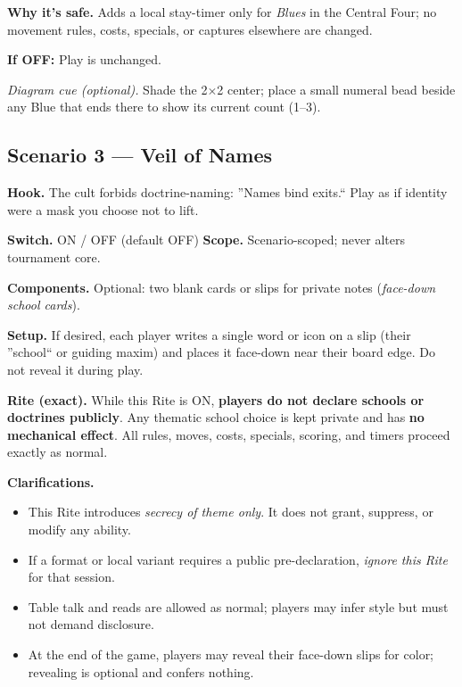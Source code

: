 \documentclass[11pt]{article}
\numberwithin{equation}{section} %
\theoremstyle{plain} %
\theoremstyle{definition} %
\theoremstyle{remark} %
\begin{document}
\medskip
\noindent\textbf{Why it's safe.} Adds a local stay-timer only for \emph{Blues} in the Central Four; no movement rules, costs, specials, or captures elsewhere are changed.

\medskip
\noindent\textbf{If \textsc{OFF}:} Play is unchanged.

\medskip
\noindent\textit{Diagram cue (optional).} Shade the 2\(\times\)2 center; place a small numeral bead beside any Blue that ends there to show its current count (1--3).

\subsection{Scenario 3 --- Veil of Names}
\label{scen:veil-of-names}

\noindent\textbf{Hook.} The cult forbids doctrine-naming: ''Names bind exits.`` Play as if identity were a mask you choose not to lift.

\medskip
\noindent\textbf{Switch.} \textsc{ON / OFF} (default \textsc{OFF}) \hfill \textbf{Scope.} Scenario-scoped; never alters tournament core.

\medskip
\noindent\textbf{Components.} Optional: two blank cards or slips for private notes (\emph{face-down school cards}).

\medskip
\noindent\textbf{Setup.} If desired, each player writes a single word or icon on a slip (their ''school`` or guiding maxim) and places it face-down near their board edge. Do not reveal it during play.

\medskip
\noindent\textbf{Rite (exact).} While this Rite is \textsc{ON}, \textbf{players do not declare schools or doctrines publicly}. Any thematic school choice is kept private and has \textbf{no mechanical effect}. All rules, moves, costs, specials, scoring, and timers proceed exactly as normal.

\medskip
\noindent\textbf{Clarifications.}
\begin{itemize}\setlength\itemsep{0.25em}
  \item This Rite introduces \emph{secrecy of theme only}. It does not grant, suppress, or modify any ability.
  \item If a format or local variant requires a public pre-declaration, \emph{ignore this Rite} for that session.
  \item Table talk and reads are allowed as normal; players may infer style but must not demand disclosure.
  \item At the end of the game, players may reveal their face-down slips for color; revealing is optional and confers nothing.
\end{itemize}
\end{document}
